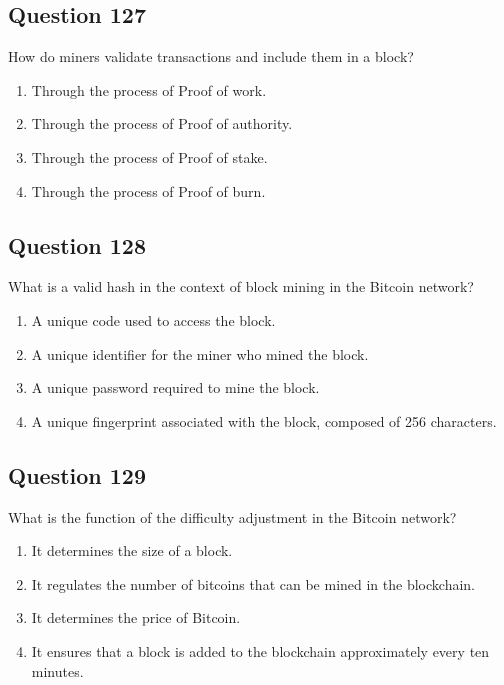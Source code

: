 \documentclass[12pt,a4paper]{article}
\begin{document}
\bigskip


\subsection*{Question 127}
How do miners validate transactions and include them in a block?

\begin{enumerate}[label=\Alph*., leftmargin=*]
\item Through the process of Proof of work.
\item Through the process of Proof of authority.
\item Through the process of Proof of stake.
\item Through the process of Proof of burn.
\end{enumerate}

\bigskip


\subsection*{Question 128}
What is a valid hash in the context of block mining in the Bitcoin network?

\begin{enumerate}[label=\Alph*., leftmargin=*]
\item A unique code used to access the block.
\item A unique identifier for the miner who mined the block.
\item A unique password required to mine the block.
\item A unique fingerprint associated with the block, composed of 256 characters.
\end{enumerate}

\bigskip


\subsection*{Question 129}
What is the function of the difficulty adjustment in the Bitcoin network?

\begin{enumerate}[label=\Alph*., leftmargin=*]
\item It determines the size of a block.
\item It regulates the number of bitcoins that can be mined in the blockchain.
\item It determines the price of Bitcoin.
\item It ensures that a block is added to the blockchain approximately every ten minutes.
\end{enumerate}
\end{document}
